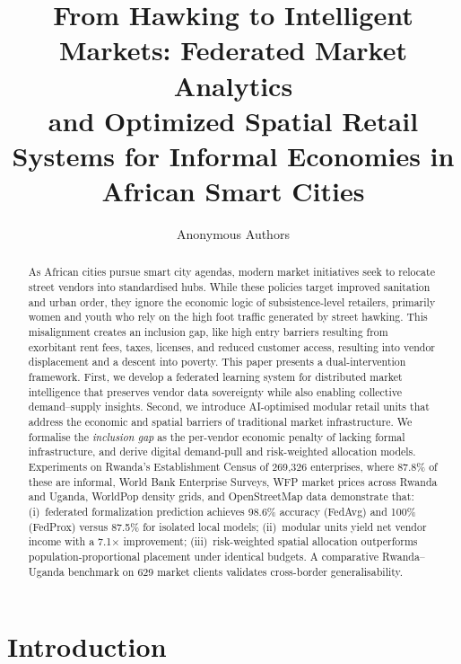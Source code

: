 \documentclass{article}
\title{From Hawking to Intelligent Markets: Federated Market Analytics\\
and Optimized Spatial Retail Systems for Informal Economies in African Smart Cities}
\author{
Anonymous Authors
}
\begin{document}
\maketitle

\begin{abstract}
As African cities pursue smart city agendas, modern market initiatives seek to relocate street vendors into standardised hubs. While these policies target improved sanitation and urban order, they ignore the economic logic of subsistence-level retailers, primarily women and youth who rely on the high foot traffic generated by street hawking.
This misalignment creates an inclusion gap, like high entry barriers resulting from exorbitant rent fees, taxes, licenses, and reduced customer access, resulting into vendor displacement and a descent into poverty. This paper presents a dual-intervention framework.
First, we develop a federated learning system for distributed market intelligence that preserves vendor data sovereignty while also enabling collective demand--supply insights.
Second, we introduce AI-optimised modular retail units that address the economic and spatial barriers of traditional market infrastructure.
We formalise the \emph{inclusion gap} as the per-vendor economic penalty of lacking formal infrastructure, and derive digital demand-pull and risk-weighted allocation models.
Experiments on Rwanda's Establishment Census of 269,326 enterprises, where 87.8\% of these are informal, World Bank Enterprise Surveys, WFP market prices across Rwanda and Uganda, WorldPop density grids, and OpenStreetMap data demonstrate that:
(i)~federated formalization prediction achieves 98.6\% accuracy (FedAvg) and 100\% (FedProx) versus 87.5\% for isolated local models;
(ii)~modular units yield net vendor income with a 7.1$\times$ improvement;
(iii)~risk-weighted spatial allocation outperforms population-proportional placement under identical budgets.
A comparative Rwanda--Uganda benchmark on 629 market clients validates cross-border generalisability.
\end{abstract}

\section{Introduction}
\label{sec:intro}
\end{document}
